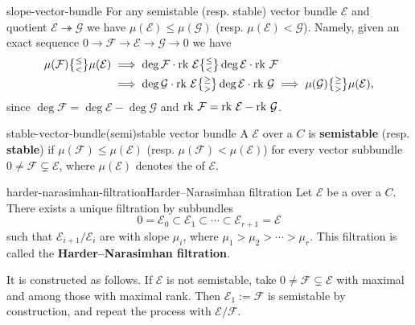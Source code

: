 \begin{example}{slope-vector-bundle}
    For any semistable (resp. stable) vector bundle $\mathcal{E}$ and quotient $\mathcal{E} \twoheadrightarrow \mathcal{G}$ we have $\mu(\mathcal{E}) \le \mu(\mathcal{G})$ (resp. $\mu(\mathcal{E}) < \mathcal{G}$). Namely, given an exact sequence $0 \to \mathcal{F} \to \mathcal{E} \to \mathcal{G} \to 0$ we have
    \[ \begin{aligned} \mu(\mathcal{F}) \genfrac{\{}{\}}{0pt}{1}{\le}{<} \mu(\mathcal{E}) &\implies \deg \mathcal{F} \cdot \textup{rk } \mathcal{E} \genfrac{\{}{\}}{0pt}{1}{\le}{<} \deg \mathcal{E} \cdot \textup{rk } \mathcal{F} \\ &\implies \deg \mathcal{G} \cdot \textup{rk } \mathcal{E} \genfrac{\{}{\}}{0pt}{1}{\ge}{>} \deg \mathcal{E} \cdot \textup{rk } \mathcal{G} \implies \mu(\mathcal{G}) \genfrac{\{}{\}}{0pt}{1}{\ge}{>} \mu(\mathcal{E})  , \end{aligned} \]
    since $\deg \mathcal{F} = \deg \mathcal{E} - \deg \mathcal{G}$ and $\textup{rk } \mathcal{F} = \textup{rk } \mathcal{E} - \textup{rk } \mathcal{G}$.
\end{example}

\begin{topic}{stable-vector-bundle}{(semi)stable vector bundle}
    A  $\mathcal{E}$ over a  $C$ is \textbf{semistable} (resp. \textbf{stable}) if $\mu(\mathcal{F}) \le \mu(\mathcal{E})$ (resp. $\mu(\mathcal{F}) < \mu(\mathcal{E})$) for every vector subbundle $0 \ne \mathcal{F} \subsetneq \mathcal{E}$, where $\mu(\mathcal{E})$ denotes the  of $\mathcal{E}$.
\end{topic}

\begin{topic}{harder-narasimhan-filtration}{Harder--Narasimhan filtration}
    Let $\mathcal{E}$ be a  over a  $C$. There exists a unique filtration by subbundles
    \[ 0 = \mathcal{E}_0 \subset \mathcal{E}_1 \subset \cdots \subset \mathcal{E}_{r + 1} = \mathcal{E} \]
    such that $\mathcal{E}_{i + 1}/\mathcal{E}_i$ are  with slope $\mu_i$, where $\mu_1 > \mu_2 > \cdots > \mu_r$. This filtration is called the \textbf{Harder--Narasimhan filtration}.
    
    It is constructed as follows. If $\mathcal{E}$ is not semistable, take $0 \ne \mathcal{F} \subsetneq \mathcal{E}$ with maximal  and among those with maximal rank. Then $\mathcal{E}_1 := \mathcal{F}$ is semistable by construction, and repeat the process with $\mathcal{E}/\mathcal{F}$.
\end{topic}

